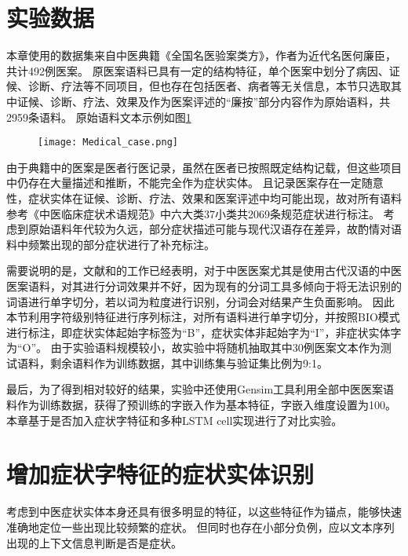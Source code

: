 \section{实验数据}
本章使用的数据集来自中医典籍《全国名医验案类方》，作者为近代名医何廉臣，共计492例医案。
原医案语料已具有一定的结构特征，单个医案中划分了病因、证候、诊断、疗法等不同项目，但也存在包括医者、病者等无关信息，本节只选取其中证候、诊断、疗法、效果及作为医案评述的“廉按”部分内容作为原始语料，共2959条语料。
原始语料文本示例如图\ref{fig:medical_case}

\begin{figure}[H]
    \centering
    \texttt{[image: Medical\_case.png]}
    \label{fig:medical_case}
\end{figure}
由于典籍中的医案是医者行医记录，虽然在医者已按照既定结构记载，但这些项目中仍存在大量描述和推断，不能完全作为症状实体。
且记录医案存在一定随意性，症状实体在证候、诊断、疗法、效果和医案评述中均可能出现，故对所有语料参考《中医临床症状术语规范》中六大类37小类共2069条规范症状进行标注。
考虑到原始语料年代较为久远，部分症状描述可能与现代汉语存在差异，故酌情对语料中频繁出现的部分症状进行了补充标注。

需要说明的是，文献和的工作已经表明，对于中医医案尤其是使用古代汉语的中医医案语料，对其进行分词效果并不好，因为现有的分词工具多倾向于将无法识别的词语进行单字切分，若以词为粒度进行识别，分词会对结果产生负面影响。
因此本节利用字符级别特征进行序列标注，对所有语料进行单字切分，并按照BIO模式进行标注，即症状实体起始字标签为“B”，症状实体非起始字为“I”，非症状实体字为“O”。
由于实验语料规模较小，故实验中将随机抽取其中30例医案文本作为测试语料，剩余语料作为训练数据，其中训练集与验证集比例为9:1。

最后，为了得到相对较好的结果，实验中还使用Gensim工具利用全部中医医案语料作为训练数据，获得了预训练的字嵌入作为基本特征，字嵌入维度设置为100。
本章基于是否加入症状字特征和多种LSTM cell实现进行了对比实验。

\section{增加症状字特征的症状实体识别}
考虑到中医症状实体本身还具有很多明显的特征，以这些特征作为锚点，能够快速准确地定位一些出现比较频繁的症状。
但同时也存在小部分负例，应以文本序列出现的上下文信息判断是否是症状。

